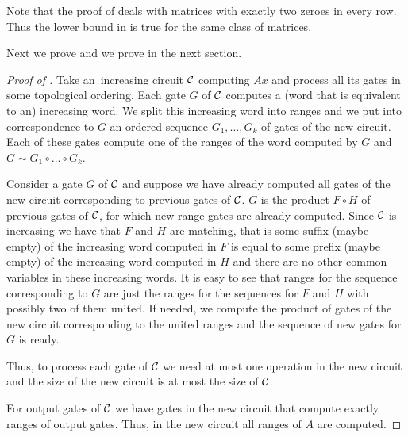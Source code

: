 \documentclass{toc}
\begin{document}
Note that the proof of  deals with matrices with exactly two zeroes in every row. Thus the lower bound in  is true for the same class of matrices.

Next we prove  and we prove  in the next section.

\begin{proof}[Proof of {}]
    Take an~increasing circuit ${\cal C}$ computing $Ax$ and process all its gates in some topological ordering. Each gate $G$ of ${\cal C}$ computes a (word that is equivalent to an) increasing word. We split this increasing word into ranges and we put into correspondence to $G$ an ordered sequence $G_1,\ldots, G_k$ of gates of the new circuit. Each of these gates compute one of the ranges of the word computed by $G$ and $G \sim G_1\circ\ldots \circ G_k$.

    Consider a gate $G$ of ${\cal C}$ and suppose we have already computed all gates of the new circuit corresponding to previous gates of ${\cal C}$. $G$ is the product $F \circ H$ of previous gates of ${\cal C}$, for which new range gates are already computed. Since ${\cal C}$ is increasing we have that $F$ and $H$ are matching, that is some suffix (maybe empty) of the increasing word computed in $F$ is equal to some prefix (maybe empty) of the increasing word computed in $H$ and there are no other common variables in these increasing words. It is easy to see that ranges for the sequence corresponding to $G$ are just the ranges for the sequences for $F$ and $H$ with possibly two of them united. If needed, we compute the product of gates of the new circuit corresponding to the united ranges and the sequence of new gates for $G$ is ready.

    Thus, to process each gate of ${\cal C}$ we need at most one operation in the new circuit and the size of the new circuit is at most the size of ${\cal C}$.

    For output gates of ${\cal C}$ we have gates in the new circuit that compute exactly ranges of output gates. Thus, in the new circuit all ranges of $A$ are computed.
\end{proof}
\end{document}
